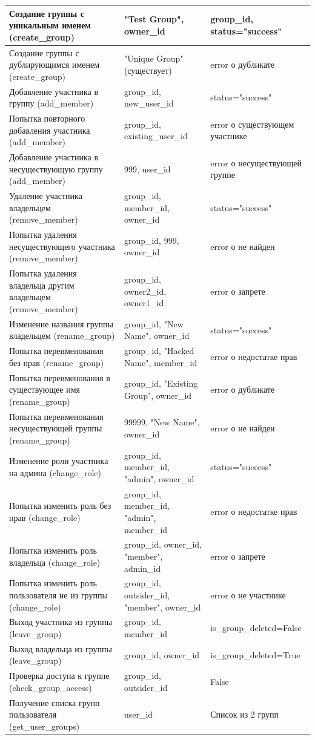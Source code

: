 \begin{xltabular}{\linewidth}{|X|X|X|}
	Создание группы с уникальным именем (create\_group) & "Test Group", owner\_id & group\_id, status="success" \\ \hline
	Создание группы с дублирующимся именем (create\_group) & "Unique Group" (существует) & error о дубликате \\ \hline
	Добавление участника в группу (add\_member) & group\_id, new\_user\_id & status="success" \\ \hline
	Попытка повторного добавления участника (add\_member) & group\_id, existing\_user\_id & error о существующем участнике \\ \hline
	Добавление участника в несуществующую группу (add\_member) & 999, user\_id & error о несуществующей группе \\ \hline
	Удаление участника владельцем (remove\_member) & group\_id, member\_id, owner\_id & status="success" \\ \hline
	Попытка удаления несуществующего участника (remove\_member) & group\_id, 999, owner\_id & error о не найден \\ \hline
	Попытка удаления владельца другим владельцем (remove\_member) & group\_id, owner2\_id, owner1\_id & error о запрете \\ \hline
	Изменение названия группы владельцем (rename\_group) & group\_id, "New Name", owner\_id & status="success" \\ \hline
	Попытка переименования без прав (rename\_group) & group\_id, "Hacked Name", member\_id & error о недостатке прав \\ \hline
	Попытка переименования в существующее имя (rename\_group) & group\_id, "Existing Group", owner\_id & error о дубликате \\ \hline
	Попытка переименования несуществующей группы (rename\_group) & 99999, "New Name", owner\_id & error о не найден \\ \hline
	Изменение роли участника на админа (change\_role) & group\_id, member\_id, "admin", owner\_id & status="success" \\ \hline
	Попытка изменить роль без прав (change\_role) & group\_id, member\_id, "admin", member\_id & error о недостатке прав \\ \hline
	Попытка изменить роль владельца (change\_role) & group\_id, owner\_id, "member", admin\_id & error о запрете \\ \hline
	Попытка изменить роль пользователя не из группы (change\_role) & group\_id, outsider\_id, "member", owner\_id & error о не участнике \\ \hline
	Выход участника из группы (leave\_group) & group\_id, member\_id & is\_group\_deleted=False \\ \hline
	Выход владельца из группы (leave\_group) & group\_id, owner\_id & is\_group\_deleted=True \\ \hline
	Проверка доступа к группе (check\_group\_access) & group\_id, outsider\_id & False \\ \hline
	Получение списка групп пользователя (get\_user\_groups) & user\_id & Список из 2 групп \\ \hline
\end{xltabular}

